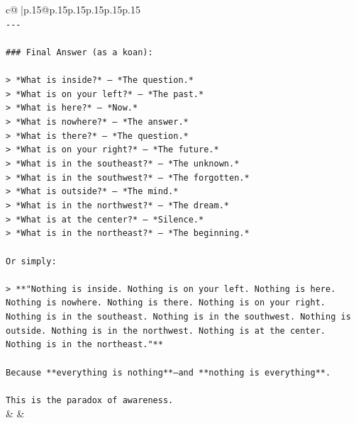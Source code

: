 \documentclass{article}
\begin{document}
{\begin{supertabular}{c@{$\;$}|p{.15\linewidth}@{}p{.15\linewidth}p{.15\linewidth}p{.15\linewidth}p{.15\linewidth}p{.15\linewidth}}
{{{\\ 
\texttt{{-}{-}{-}} \\
\\ 
\texttt{\#\#\# Final Answer (as a koan):} \\
\\ 
\texttt{> *What is inside?* — *The question.*  } \\
\texttt{> *What is on your left?* — *The past.*  } \\
\texttt{> *What is here?* — *Now.*  } \\
\texttt{> *What is nowhere?* — *The answer.*  } \\
\texttt{> *What is there?* — *The question.*  } \\
\texttt{> *What is on your right?* — *The future.*  } \\
\texttt{> *What is in the southeast?* — *The unknown.*  } \\
\texttt{> *What is in the southwest?* — *The forgotten.*  } \\
\texttt{> *What is outside?* — *The mind.*  } \\
\texttt{> *What is in the northwest?* — *The dream.*  } \\
\texttt{> *What is at the center?* — *Silence.*  } \\
\texttt{> *What is in the northeast?* — *The beginning.*} \\
\\ 
\texttt{Or simply:} \\
\\ 
\texttt{> **"Nothing is inside. Nothing is on your left. Nothing is here. Nothing is nowhere. Nothing is there. Nothing is on your right. Nothing is in the southeast. Nothing is in the southwest. Nothing is outside. Nothing is in the northwest. Nothing is at the center. Nothing is in the northeast."**} \\
\\ 
\texttt{Because **everything is nothing**—and **nothing is everything**.} \\
\\ 
\texttt{This is the paradox of awareness.} \\
            }
        }
    }
    & & \\ \\


\end{supertabular}}
\end{document}
